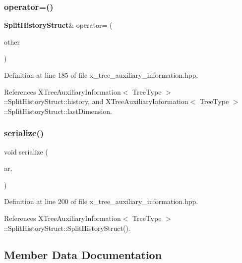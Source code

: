 \subsubsection{operator=()}
{\footnotesize\ttfamily \textbf{ Split\+History\+Struct}\& operator= (\begin{DoxyParamCaption}\item[{const \textbf{ Split\+History\+Struct} \&}]{other }\end{DoxyParamCaption})\hspace{0.3cm}{\ttfamily [inline]}}



Definition at line 185 of file x\+\_\+tree\+\_\+auxiliary\+\_\+information.\+hpp.



References X\+Tree\+Auxiliary\+Information$<$ Tree\+Type $>$\+::\+Split\+History\+Struct\+::history, and X\+Tree\+Auxiliary\+Information$<$ Tree\+Type $>$\+::\+Split\+History\+Struct\+::last\+Dimension.

\mbox{\label{structmlpack_1_1tree_1_1XTreeAuxiliaryInformation_1_1SplitHistoryStruct_a65cba07328997659bec80b9879b15a51}} 
\subsubsection{serialize()}
{\footnotesize\ttfamily void serialize (\begin{DoxyParamCaption}\item[{Archive \&}]{ar,  }\item[{const uint32\+\_\+t}]{ }\end{DoxyParamCaption})\hspace{0.3cm}{\ttfamily [inline]}}



Definition at line 200 of file x\+\_\+tree\+\_\+auxiliary\+\_\+information.\+hpp.



References X\+Tree\+Auxiliary\+Information$<$ Tree\+Type $>$\+::\+Split\+History\+Struct\+::\+Split\+History\+Struct().



\subsection{Member Data Documentation}
\mbox{\label{structmlpack_1_1tree_1_1XTreeAuxiliaryInformation_1_1SplitHistoryStruct_a784e99d8faa7cf347b7a86d9380ddc1d}} 
